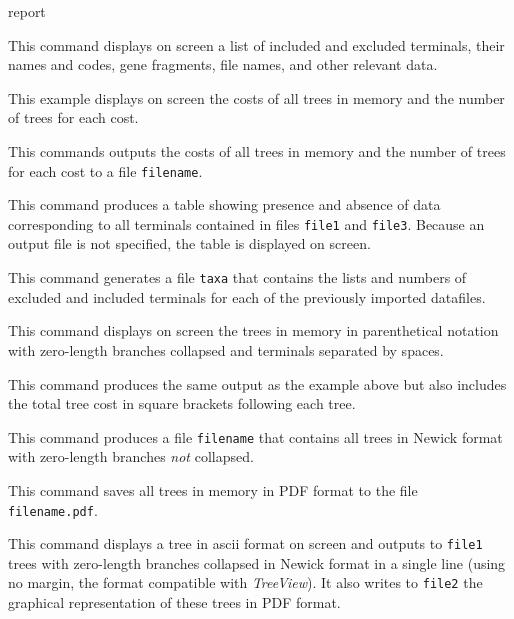 \begin{command}{report}{}
\begin{poyexamples}
            {This command displays on screen a list of included and excluded terminals, their
            names and codes, gene fragments, file names, and other relevant data.}
            
            {This example displays on screen the costs of all trees in memory and the
            number of trees for each cost.}

            {This commands outputs the costs of all trees in memory and the
            number of trees for each cost to a file \texttt{filename}.}

		{This command produces a table showing presence
		and absence of data corresponding to all terminals contained
		in files \texttt{file1} and \texttt{file3}. Because an output
		file is not specified, the table is displayed on screen.}
		
		{This command generates a file \texttt{taxa} that contains the
		lists and numbers of excluded and included terminals for each of the previously
		imported datafiles.}
		
            {This command displays on screen the trees in memory in parenthetical
            notation with zero-length branches collapsed and terminals
            separated by spaces.}

            {This command produces the same output as the example above
            but also includes the total tree cost in square brackets
            following each tree.}

            {This command produces a file \texttt{filename} that contains
            all trees in Newick format with zero-length branches \emph{not}
            collapsed.}
		
            {This command saves all trees in memory in
            PDF format to the file \texttt{filename.pdf}.}

		{This command displays a tree in ascii format on screen and outputs
		to \texttt{file1} trees with zero-length branches collapsed in Newick format
		in a single line (using no margin, the format compatible with \emph{TreeView}). It
		also writes to \texttt{file2} the graphical representation of these trees in
		PDF format.}


\end{poyexamples}
\end{command}
